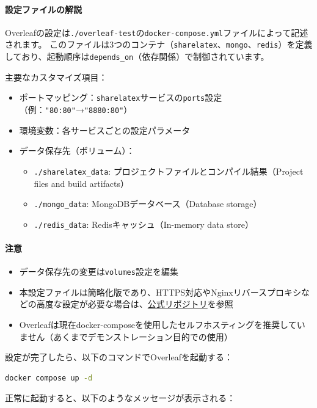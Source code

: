 \paragraph{設定ファイルの解説}
Overleafの設定は\texttt{./overleaf-test}の\texttt{docker-compose.yml}ファイルによって記述されます。
このファイルは3つのコンテナ（\texttt{sharelatex}、\texttt{mongo}、\texttt{redis}）を定義しており、起動順序は\texttt{depends\_on}（依存関係）で制御されています。

主要なカスタマイズ項目：
\begin{itemize}
\item ポートマッピング：\texttt{sharelatex}サービスの\texttt{ports}設定（例：\texttt{"80:80"}→\texttt{"8880:80"}）
\item 環境変数：各サービスごとの設定パラメータ
\item データ保存先（ボリューム）：
  \begin{itemize}
  \item \texttt{./sharelatex\_data}: プロジェクトファイルとコンパイル結果（Project files and build artifacts）
  \item \texttt{./mongo\_data}: MongoDBデータベース（Database storage）
  \item \texttt{./redis\_data}: Redisキャッシュ（In-memory data store）
  \end{itemize}
\end{itemize}

\paragraph{注意}
\begin{itemize}
\item データ保存先の変更は\texttt{volumes}設定を編集
\item 本設定ファイルは簡略化版であり、HTTPS対応やNginxリバースプロキシなどの高度な設定が必要な場合は、\href{https://github.com/overleaf/overleaf/tree/main}{公式リポジトリ}を参照
\item Overleafは現在docker-composeを使用したセルフホスティングを推奨していません（あくまでデモンストレーション目的での使用）
\end{itemize}

設定が完了したら、以下のコマンドでOverleafを起動する：

\begin{lstlisting}[language=bash]
docker compose up -d
\end{lstlisting}

正常に起動すると、以下のようなメッセージが表示される：

